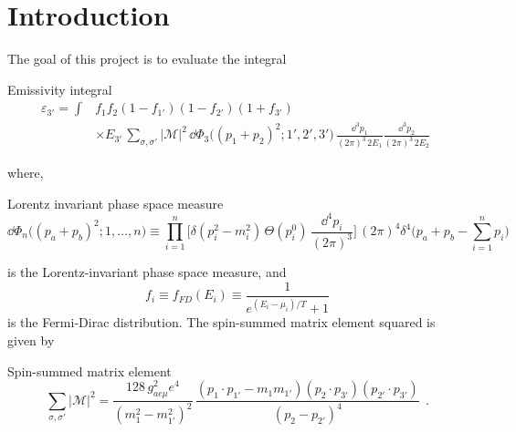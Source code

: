 \section{Introduction}
\label{sec:introduction}
The goal of this project is to evaluate the integral 

\begin{bluenv}{Emissivity integral}
    \begin{equation}
    \label{eq:emissivity-integral}
    \begin{aligned}
        \varepsilon_{3'} = \int 
            & f_1 f_2 (1 - f_{1'}) (1 - f_{2'}) (1 + f_{3'}) \\
            &\times E_{3'} \,
            \sum_{\sigma, \sigma'} | \mathcal{M} |^2 \,
            \dd \Phi_3 \big( (p_1 + p_2)^2; 1', 2', 3'\big)
            \,
            \frac{\dd^3 p_1}{(2\pi)^3\,2 E_1}
            \frac{\dd^3 p_2}{(2\pi)^3\,2 E_2} 
            \; 
    \end{aligned}
    \end{equation}
\end{bluenv}
where, 
\begin{bluenv}{Lorentz invariant phase space measure}
    \begin{equation}
        \label{eq:LIPS}
        \dd \Phi_n \big((p_a + p_b)^2; 1, \ldots, n \big) \equiv 
        \prod_{i=1}^{n}
        \bigg[
             \delta (p_i^2 - m_i^2) \, \Theta(p_i^0) \, 
            \frac{\dd^4 p_i}{(2\pi)^3}
        \bigg] \, (2\pi)^4 \delta^4 
        \bigg( 
            p_a + p_b - \sum_{i=1}^{n} p_i
        \bigg) \quad 
    \end{equation}
\end{bluenv}
is the Lorentz-invariant phase space measure, and
\begin{equation*}
    f_i \equiv f_{FD}(E_i) \equiv \frac{1}{e^{(E_i - \mu_i)/T} + 1}
\end{equation*}
is the Fermi-Dirac distribution. 
The spin-summed matrix element squared is given by
\begin{bluenv}{Spin-summed matrix element}
    \begin{equation}
        \label{eq:matrix-element}
        \sum_{\sigma, \sigma'} | \mathcal{M} |^2 
            = 
            \frac{128 \, g^2_{ae\mu} e^4}{(m_1^2 - m_{1'}^2)^2} \,
            \frac{
                 (p_1 \cdot p_{1'} - m_1 m_{1'})
                (p_2 \cdot p_{3'})
                (p_{2'} \cdot p_{3'})
            }
            {
                (p_2 - p_{2'})^4
            } \; \, .
    \end{equation}
\end{bluenv}


